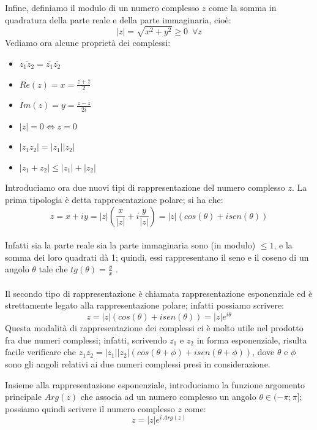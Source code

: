 Infine, definiamo il modulo di un numero complesso $z$ come la somma in quadratura della parte reale e della parte immaginaria, cioè:
\begin{equation}
|z|=\sqrt{x^2+y^2}\geq0 \, \, \, \forall z
\end{equation}
\clearpage
Vediamo ora alcune proprietà dei complessi:
\begin{itemize}
\item $\overline{z_1 z_2}=\overline{z_1} \overline{z_2}$
\item $Re(z)=x=\frac{z+\overline{z}}{2}$
\item $Im(z)=y=\frac{z-\overline{z}}{2i}$
\item $|z|=0 \iff z=0$
\item $|z_1 z_2|=|z_1| |z_2|$
\item $|z_1 + z_2| \leq |z_1| + |z_2|$
\end{itemize}
Introduciamo ora due nuovi tipi di rappresentazione del numero complesso $z$. La prima tipologia è detta rappresentazione polare; si ha che:
\begin{equation}
z=x+iy=|z| \left(\frac{x}{|z|}+i \frac{y}{|z|}\right)=|z|(cos(\theta) +i sen(\theta))
\end{equation}\\Infatti sia la parte reale sia la parte immaginaria sono (in modulo) $\leq 1$, e la somma dei loro quadrati dà 1; quindi,  essi rappresentano il seno e il coseno di un angolo $\theta$ tale che $tg(\theta)=\frac{y}{x}$ .
\\
\\
Il secondo tipo di rappresentazione è chiamata rappresentazione esponenziale ed è strettamente legato alla rappresentazione polare; infatti possiamo scrivere:
\begin{equation}
z=|z| (cos(\theta) +i sen(\theta))=|z| e^{i \theta}
\end{equation}
Questa modalità di rappresentazione dei complessi ci è molto utile nel prodotto fra due numeri complessi; infatti, scrivendo $z_1$ e $z_2$ in forma esponenziale, risulta facile verificare che $z_1 z_2=|z_1||z_2|(cos(\theta + \phi) +i sen(\theta + \phi))$, dove $\theta$ e $\phi$ sono gli angoli relativi ai due numeri complessi presi in considerazione.

Insieme alla rappresentazione esponenziale, introduciamo la funzione argomento principale $Arg(z)$ che associa ad un numero complesso un angolo $\theta \in (-\pi;\pi]$; possiamo quindi scrivere il numero complesso $z$ come:
\begin{equation}
z=|z| e^{i \, Arg(z)}
\end{equation}

